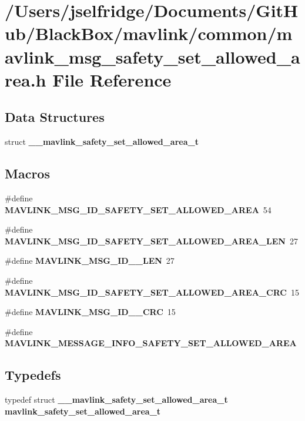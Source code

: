 \section{/\+Users/jselfridge/\+Documents/\+Git\+Hub/\+Black\+Box/mavlink/common/mavlink\+\_\+msg\+\_\+safety\+\_\+set\+\_\+allowed\+\_\+area.h File Reference}
\label{mavlink__msg__safety__set__allowed__area_8h}
\subsection*{Data Structures}
\begin{DoxyCompactItemize}
\item 
struct \textbf{ \+\_\+\+\_\+mavlink\+\_\+safety\+\_\+set\+\_\+allowed\+\_\+area\+\_\+t}
\end{DoxyCompactItemize}
\subsection*{Macros}
\begin{DoxyCompactItemize}
\item 
\#define \textbf{ M\+A\+V\+L\+I\+N\+K\+\_\+\+M\+S\+G\+\_\+\+I\+D\+\_\+\+S\+A\+F\+E\+T\+Y\+\_\+\+S\+E\+T\+\_\+\+A\+L\+L\+O\+W\+E\+D\+\_\+\+A\+R\+EA}~54
\item 
\#define \textbf{ M\+A\+V\+L\+I\+N\+K\+\_\+\+M\+S\+G\+\_\+\+I\+D\+\_\+\+S\+A\+F\+E\+T\+Y\+\_\+\+S\+E\+T\+\_\+\+A\+L\+L\+O\+W\+E\+D\+\_\+\+A\+R\+E\+A\+\_\+\+L\+EN}~27
\item 
\#define \textbf{ M\+A\+V\+L\+I\+N\+K\+\_\+\+M\+S\+G\+\_\+\+I\+D\+\_\+\_\+\+L\+EN}~27
\item 
\#define \textbf{ M\+A\+V\+L\+I\+N\+K\+\_\+\+M\+S\+G\+\_\+\+I\+D\+\_\+\+S\+A\+F\+E\+T\+Y\+\_\+\+S\+E\+T\+\_\+\+A\+L\+L\+O\+W\+E\+D\+\_\+\+A\+R\+E\+A\+\_\+\+C\+RC}~15
\item 
\#define \textbf{ M\+A\+V\+L\+I\+N\+K\+\_\+\+M\+S\+G\+\_\+\+I\+D\+\_\+\_\+\+C\+RC}~15
\item 
\#define \textbf{ M\+A\+V\+L\+I\+N\+K\+\_\+\+M\+E\+S\+S\+A\+G\+E\+\_\+\+I\+N\+F\+O\+\_\+\+S\+A\+F\+E\+T\+Y\+\_\+\+S\+E\+T\+\_\+\+A\+L\+L\+O\+W\+E\+D\+\_\+\+A\+R\+EA}
\end{DoxyCompactItemize}
\subsection*{Typedefs}
\begin{DoxyCompactItemize}
\item 
typedef struct \textbf{ \+\_\+\+\_\+mavlink\+\_\+safety\+\_\+set\+\_\+allowed\+\_\+area\+\_\+t} \textbf{ mavlink\+\_\+safety\+\_\+set\+\_\+allowed\+\_\+area\+\_\+t}
\end{DoxyCompactItemize}


